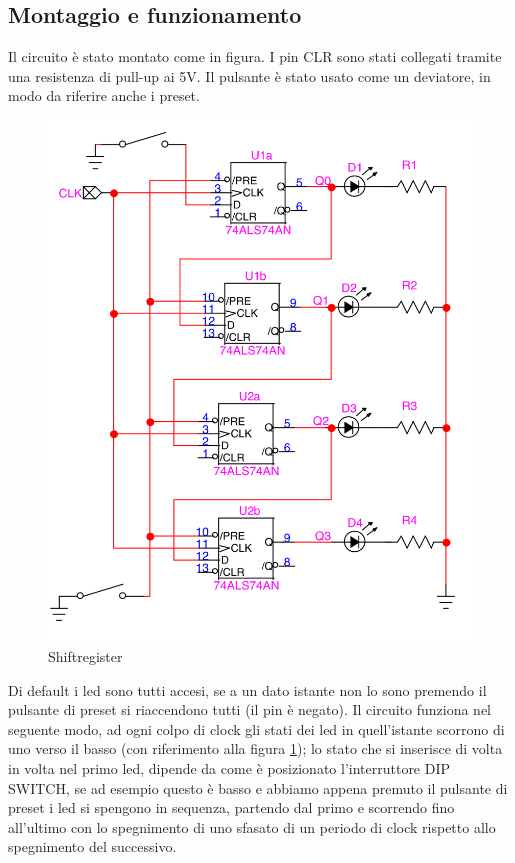 \documentclass[10pt,a4paper]{article}
\begin{document}
\subsection{Montaggio e funzionamento}
Il circuito è stato montato come in figura. I pin CLR sono stati collegati tramite una resistenza di pull-up ai 5V. Il pulsante è stato usato come un deviatore, in modo da riferire anche i preset.
\begin{figure}[h]
	\includegraphics[scale=1]{circuito3.png}
	\caption{Shiftregister} 
	\label{fig:9}                               
\end{figure}
Di default i led sono tutti accesi, se a un dato istante non lo sono  premendo il pulsante di preset si riaccendono tutti (il pin è negato). Il circuito funziona nel seguente modo, ad ogni colpo di clock gli stati dei led in quell'istante  scorrono di uno verso il basso (con riferimento alla figura \ref{fig:9}); lo stato che si inserisce di volta in volta nel primo led, dipende da come è posizionato l'interruttore DIP SWITCH, se ad esempio questo è basso e abbiamo appena premuto il pulsante di preset    i led si spengono in sequenza, partendo dal primo e scorrendo fino all'ultimo con lo spegnimento di uno sfasato di un periodo di clock rispetto allo spegnimento del successivo. 
\end{document}
